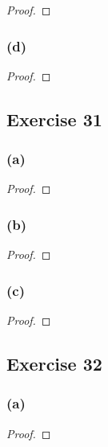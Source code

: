 \documentclass[14pt]{extarticle}
\begin{document}
\begin{proof}

\end{proof}

\subsubsection{(d)}

\begin{proof}

\end{proof}

\subsection{Exercise 31}

\subsubsection{(a)}

\begin{proof}

\end{proof}

\subsubsection{(b)}

\begin{proof}

\end{proof}

\subsubsection{(c)}

\begin{proof}

\end{proof}

\subsection{Exercise 32}

\subsubsection{(a)}

\begin{proof}

\end{proof}
\end{document}
